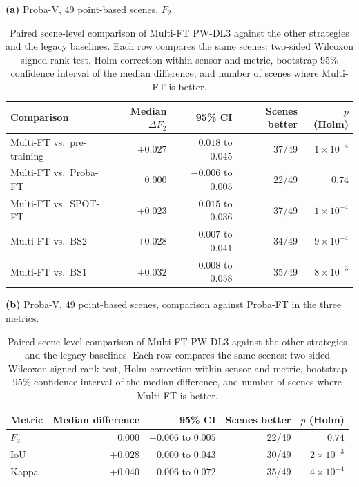 \begin{table}[h]
\centering
\caption{Paired scene-level comparison of Multi-FT PW-DL3 against the other strategies and the legacy baselines. Each row compares the same scenes: two-sided Wilcoxon signed-rank test, Holm correction within sensor and metric, bootstrap 95\% confidence interval of the median difference, and number of scenes where Multi-FT is better.}
\label{tab:paired}
\small
\setlength{\tabcolsep}{4pt}

\textbf{(a)} Proba-V, 49 point-based scenes, $F_2$.
\\[2pt]
\begin{tabular}{lrrrr}
\toprule
Comparison & Median $\Delta F_2$ & 95\% CI & Scenes better & $p$ (Holm) \\
\midrule
Multi-FT vs.\ pre-training & $+0.027$ & $0.018$ to $0.045$ & 37/49 & $1\times10^{-4}$ \\
Multi-FT vs.\ Proba-FT     & $0.000$  & $-0.006$ to $0.005$ & 22/49 & $0.74$ \\
Multi-FT vs.\ SPOT-FT      & $+0.023$ & $0.015$ to $0.036$ & 37/49 & $1\times10^{-4}$ \\
Multi-FT vs.\ BS2          & $+0.028$ & $0.007$ to $0.041$ & 34/49 & $9\times10^{-4}$ \\
Multi-FT vs.\ BS1          & $+0.032$ & $0.008$ to $0.058$ & 35/49 & $8\times10^{-3}$ \\
\bottomrule
\end{tabular}

\vspace{8pt}
\textbf{(b)} Proba-V, 49 point-based scenes, comparison against Proba-FT in the three metrics.
\\[2pt]
\begin{tabular}{lrrrr}
\toprule
Metric & Median difference & 95\% CI & Scenes better & $p$ (Holm) \\
\midrule
$F_2$   & $0.000$  & $-0.006$ to $0.005$ & 22/49 & $0.74$ \\
IoU     & $+0.028$ & $0.000$ to $0.043$ & 30/49 & $2\times10^{-3}$ \\
Kappa   & $+0.040$ & $0.006$ to $0.072$ & 35/49 & $4\times10^{-4}$ \\
\bottomrule
\end{tabular}


\end{table}
